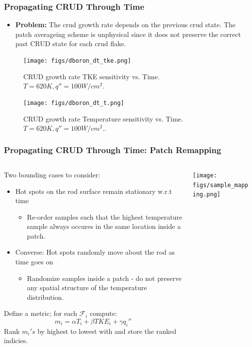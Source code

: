 \documentclass[t, pdftex]{beamer}
\begin{document}
\begin{frame}[shrink=10]
\frametitle{Propagating CRUD Through Time}
\begin{itemize}
\item  \textbf{Problem:}  The crud growth rate depends on the previous crud state.  The patch averageing scheme is unphysical since it does not preserve the correct past CRUD state for each crud flake. 
\end{itemize}
\begin{figure}[!htbp]
\centering
\begin{minipage}{.5\textwidth}
  \texttt{[image: figs/dboron\_dt\_tke.png]}
\caption{CRUD growth rate TKE sensitivity vs. Time. $T=620K, q''=100W/cm^2$.} 
\label{fig:crud_pre_map}
\end{minipage}%
\begin{minipage}{.5\textwidth}
  \texttt{[image: figs/dboron\_dt\_t.png]}
\caption{CRUD growth rate Temperature sensitivity vs. Time. $T=620K, q''=100W/cm^2$..}
\label{fig:crud_post_map}
\end{minipage}
\end{figure}
\end{frame}

\begin{frame}[shrink=20]
\frametitle{Propagating CRUD Through Time: Patch Remapping}
\begin{columns}
\begin{column}{0.5\textwidth}
   Two bounding cases to consider:
\begin{itemize}
\item Hot spots on the rod surface remain stationary w.r.t time
	\begin{itemize}
	\item Re-order samples such that the highest temperature sample always occures in the same location inside a patch.
	\end{itemize}
\item Converse: Hot spots randomly move about the rod as time goes on
	\begin{itemize}
	\item Randomize samples inside a patch - do not preserve any spatial structure of the temperature distribution.
	\end{itemize}
\end{itemize}
Define a metric; for each $\mathcal F_i$ compute:
\[
m_i = \alpha T_i + \beta TKE_i + \gamma q_i''
\]
Rank $m_i's$ by highest to lowest with and store the ranked indicies.
\end{column}
\begin{column}{0.5\textwidth}  %
    \begin{center}
     \texttt{[image: figs/sample\_mapping.png]}
     \end{center}
\end{column}
\end{columns}
\end{frame}
\end{document}
